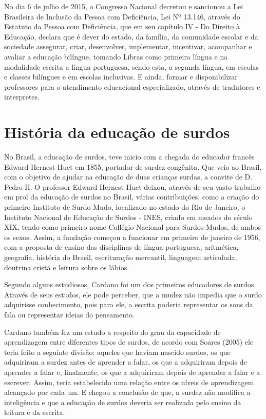 \documentclass[brasil]{abnt}
\begin{document}
		No dia 6 de julho de 2015, o Congresso Nacional decretou e sancionou a Lei Brasileira de Inclusão da Pessoa com Deficiência, Lei Nº 13.146, através do Estatuto da Pessoa com Deficiência, que em seu 
		capítulo IV - Do Direito à Educação, declara que é dever do estado, da família, da comunidade escolar e da sociedade assegurar, criar, desenvolver, implementar, incentivar, acompanhar e avaliar a 
		educação bilíngue, tomando Libras como primeira língua e na modalidade escrita a língua portuguesa, sendo esta, a segunda língua, em escolas e classes bilíngues e em escolas inclusivas. E ainda, formar
		e disponibilizar professores para o atendimento educacional especializado, através de tradutores e interpretes.   
				

\chapter{História da educação de surdos}
	
	No Brasil, a educação de surdos, teve inicio com a chegada do educador francês Edward Hernest Huet em 1855, portador de surdez congênita. Que veio ao Brasil, com o objetivo de ajudar na educação de duas 
	crianças surdas, a convite de D. Pedro II. O professor Edward Hernest Huet deixou, através de seu vasto trabalho em prol da educação de surdos no Brasil, várias contribuições, como a criação do primeiro 
	Instituto de Surdo Mudo, localizado no estado do Rio de Janeiro, o Instituto Nacional de Educação de Surdos - INES, criado em meados do século 
	XIX, tendo como primeiro nome Collégio Nacional para Surdos-Mudos, de ambos os sexos. Assim, a fundação começou a funcionar em primeiro de janeiro de 1956, com a proposta de ensino das disciplinas de língua 
	portuguesa, aritmética, geografia, história do Brasil, escrituração mercantil, linguagem articulada, doutrina cristã e leitura sobre os lábios.    	
	
	Segundo alguns estudiosos, Cardano foi um dos primeiros educadores de surdos. Através de seus estudos, ele pode perceber, que a mudez não impedia que o surdo adquirisse conhecimento, pois para ele, a 
	escrita poderia representar os sons da fala ou representar ideias do pensamento. 
	
	Cardano também fez um estudo a respeito do grau da capacidade de aprendizagem entre diferentes tipos de surdos, de acordo com Soares (2005) ele teria feito a seguinte divisão: aqueles que haviam 
	nascido surdos, os que adquiriram a surdez antes de aprender a falar, os que a adquiriram depois de aprender a falar e, finalmente, os que a adquiriram depois de aprender a falar e a escrever. 
	Assim, teria estabelecido uma relação entre os níveis de aprendizagem alcançado por cada um. E chegou a conclusão de que, a surdez não modifica a inteligência e que a educação de surdos deveria ser 
	realizada pelo ensino da leitura e da escrita.
	
\end{document}
